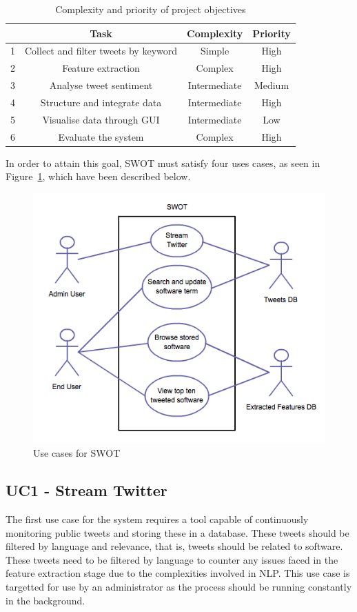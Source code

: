 \begin{table}
\begin{center}
\begin{tabular}{|r|c|c|c|}\hline\hline
&\textbf{Task}&\textbf{Complexity}&\textbf{Priority}\\\hline
1&Collect and filter tweets by keyword&Simple&High\\
2&Feature extraction&Complex&High\\
3&Analyse tweet sentiment&Intermediate&Medium\\
4&Structure and integrate data&Intermediate&High\\
5&Visualise data through GUI&Intermediate&Low\\
6&Evaluate the system&Complex&High\\\hline\hline
\end{tabular}
\end{center}
\caption{Complexity and priority of project objectives}\label{tbl:objectives}
\end{table}

In order to attain this goal, SWOT must satisfy four uses cases, as seen in Figure~\ref{fig:uc}, which have been described below.

\begin{figure}[h]
\begin{center}
\includegraphics[width=12cm]{uc}
\end{center}
\caption{Use cases for SWOT}
\label{fig:uc}
\end{figure}

\subsection[Use Case 1]{UC1 - Stream Twitter}
\label{sec:uc1}
The first use case for the system requires a tool capable of continuously monitoring public tweets and storing these in a database. These tweets should be filtered by language and relevance, that is, tweets should be related to software. These tweets need to be filtered by language to counter any issues faced in the feature extraction stage due to the complexities involved in NLP. This use case is targetted for use by an administrator as the process should be running constantly in the background.

